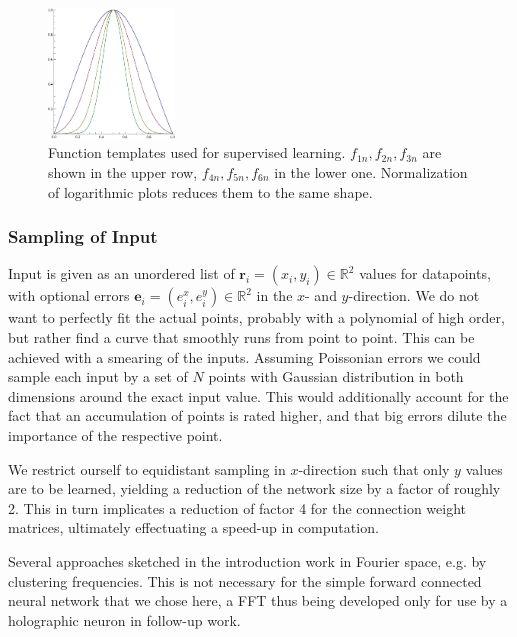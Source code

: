 \documentclass[useAMS,usenatbib]{mn2e}
\begin{document}
\begin{figure}
\begin{center}
    \includegraphics[width=0.3\textwidth]{fig/Template6n.eps}
  \end{center}
  \caption{\label{fig:classfct}Function templates used for supervised
    learning. $f_{1n},f_{2n},f_{3n}$ are shown in the upper row,
    $f_{4n},f_{5n},f_{6n}$ in the lower one. Normalization of
    logarithmic plots reduces them to the same shape.}
\end{figure}

\subsubsection{Sampling of Input}
Input is given as an unordered list of
$\mathbf{r}_i=(x_i,y_i)\in\mathbb{R}^2$ values for datapoints, with
optional errors $\mathbf{e}_i=(e_i^x,e_i^y)\in\mathbb{R}^2$ in the
$x$- and $y$-direction. We do not want to perfectly fit the actual
points, probably with a polynomial of high order, but rather find a
curve that smoothly runs from point to point. This can be achieved
with a smearing of the inputs. Assuming Poissonian errors we could
sample each input by a set of $N$ points with Gaussian distribution in
both dimensions around the exact input value. This would additionally
account for the fact that an accumulation of points is rated higher,
and that big errors dilute the importance of the respective point.

We restrict ourself to equidistant sampling in $x$-direction such
that only $y$ values are to be learned, yielding a reduction of the
network size by a factor of roughly 2. This in turn implicates a reduction of
factor 4 for the connection weight matrices, ultimately effectuating a
speed-up in computation.

Several approaches sketched in the introduction work in Fourier space,
e.g. by clustering frequencies. This is not necessary for the simple
forward connected neural network that we chose here, a FFT thus being
developed only for use by a holographic neuron in follow-up work.

%
\end{document}
